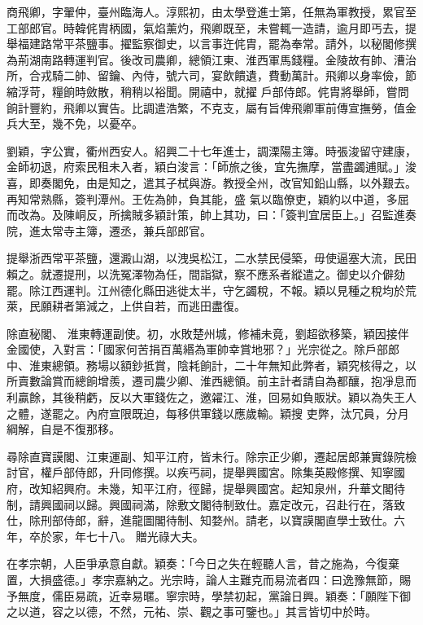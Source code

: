 \begin{pinyinscope}
 商飛卿，字翬仲，臺州臨海人。淳熙初，由太學登進士第，任無為軍教授，累官至工部郎官。時韓侂胄柄國，氣焰薰灼，飛卿既至，未嘗輒一造請，逾月即丐去，提舉福建路常平茶鹽事。擢監察御史，以言事迕侂胄，罷為奉常。請外，以秘閣修撰為荊湖南路轉運判官。後改司農卿，總領江東、淮西軍馬錢糧。金陵故有帥、漕治所，合戎騎二帥、留鑰、內侍，號六司，宴飲饋遺，費動萬計。飛卿以身率儉，節縮浮苛，糧餉時斂散，稍稍以裕聞。開禧中，就擢
 戶部侍郎。侂胄將舉師，嘗問餉計豐約，飛卿以實告。比調遣浩繁，不克支，屬有旨俾飛卿軍前傳宣撫勞，值金兵大至，幾不免，以憂卒。



 劉穎，字公實，衢州西安人。紹興二十七年進士，調溧陽主簿。時張浚留守建康，金師初退，府索民租未入者，穎白浚言：「師旅之後，宜先撫摩，當盡蠲逋賦。」浚喜，即奏閣免，由是知之，遣其子栻與游。教授全州，改官知鉛山縣，以外艱去。再知常熟縣，簽判潭州。王佐為帥，負其能，盛
 氣以臨僚吏，穎約以中道，多屈而改為。及陳峒反，所擒賊多穎計策，帥上其功，曰：「簽判宜居臣上。」召監進奏院，進太常寺主簿，遷丞，兼兵部郎官。



 提舉浙西常平茶鹽，還澱山湖，以洩吳松江，二水禁民侵築，毋使逼塞大流，民田賴之。就遷提刑，以洗冤澤物為任，間詣獄，察不應系者縱遣之。御史以介僻劾罷。除江西運判。江州德化縣田逃徙太半，守乞蠲稅，不報。穎以見種之稅均於荒萊，民願耕者第減之，上供自若，而逃田盡復。



 除直秘閣、
 淮東轉運副使。初，水敗楚州城，修補未竟，劉超欲移築，穎因接伴金國使，入對言：「國家何苦捐百萬緡為軍帥幸賞地邪？」光宗從之。除戶部郎中、淮東總領。務場以額鈔抵賞，陰耗餉計，二十年無知此弊者，穎究核得之，以所賣數論賞而總餉增羨，遷司農少卿、淮西總領。前主計者請自為都釀，抱凈息而利贏餘，其後稍虧，反以大軍錢佐之，邀糴江、淮，回易如負販狀。穎以為失王人之體，遂罷之。內府宣限既迫，每移供軍錢以應歲輸。穎搜
 吏弊，汰冗員，分月綱解，自是不復那移。



 尋除直寶謨閣、江東運副、知平江府，皆未行。除宗正少卿，遷起居郎兼實錄院檢討官，權戶部侍郎，升同修撰。以疾丐祠，提舉興國宮。除集英殿修撰、知寧國府，改知紹興府。未幾，知平江府，徑歸，提舉興國宮。起知泉州，升華文閣待制，請興國祠以歸。興國祠滿，除敷文閣待制致仕。嘉定改元，召赴行在，落致仕，除刑部侍郎，辭，進龍圖閣待制、知婺州。請老，以寶謨閣直學士致仕。六年，卒於家，年七十八。
 贈光祿大夫。



 在孝宗朝，人臣爭承意自獻。穎奏：「今日之失在輕聽人言，昔之施為，今復棄置，大損盛德。」孝宗嘉納之。光宗時，論人主難克而易流者四：曰逸豫無節，賜予無度，儒臣易疏，近幸易暱。寧宗時，學禁初起，黨論日興。穎奏：「願陛下御之以道，容之以德，不然，元祐、崇、觀之事可鑒也。」其言皆切中於時。




\end{pinyinscope}
